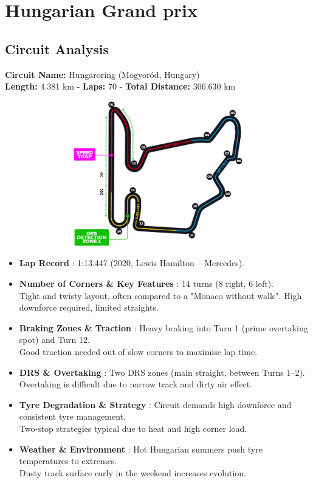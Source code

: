 \section{Hungarian Grand prix}

\subsection{Circuit Analysis}

\textbf{Circuit Name:} Hungaroring (Mogyoród, Hungary) \\
\textbf{Length:} 4.381 km - \textbf{Laps:} 70 - \textbf{Total Distance:} 306.630 km

\begin{figure}[H]
    \centering
    \includegraphics[width=0.75\linewidth]{images/13.Hungary_Circuit.jpg}
\end{figure}


\begin{itemize}
    \item \textbf{Lap Record} : 1:13.447 (2020, Lewis Hamilton – Mercedes).
    
    \item \textbf{Number of Corners \& Key Features} : 14 turns (8 right, 6 left). \\
    Tight and twisty layout, often compared to a "Monaco without walls". High downforce required, limited straights.
    
    \item \textbf{Braking Zones \& Traction} : Heavy braking into Turn 1 (prime overtaking spot) and Turn 12. \\
    Good traction needed out of slow corners to maximise lap time.

    \item \textbf{DRS \& Overtaking} : Two DRS zones (main straight, between Turns 1–2). \\
    Overtaking is difficult due to narrow track and dirty air effect.
    
    \item \textbf{Tyre Degradation \& Strategy} : Circuit demands high downforce and consistent tyre management. \\
    Two-stop strategies typical due to heat and high corner load. 
    
    \item \textbf{Weather \& Environment} : Hot Hungarian summers push tyre temperatures to extremes. \\
    Dusty track surface early in the weekend increases evolution.
\end{itemize}

